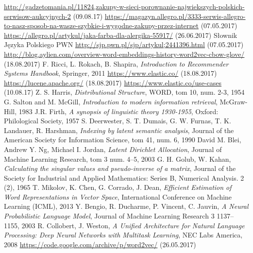\documentclass[pl]{minipw} %
\begin{document}
\begin{thebibliography}{30}
	\url{http://gadzetomania.pl/11824,zakupy-w-sieci-porownanie-najwiekszych-polskich-serwisow-aukcyjnych-2}
	(09.08.17)
	\url{https://magazyn.allegro.pl/3333-serwis-allegro-to-nasz-sposob-na-wasze-szybkie-i-wygodne-zakupy-przez-internet}
	(07.05.2017)
	\url{https://allegro.pl/artykul/jaka-farba-dla-alergika-55917/}
	(26.06.2017)
	Słownik Języka Polskiego PWN
	\url{http://sjp.pwn.pl/sjp/artykul;2441396.html}
	(07.05.2017)
	\url{http://blog.aylien.com/overview-word-embeddings-history-word2vec-cbow-glove/}
	(18.08.2017)
	F. Ricci, L. Rokach, B. Shapira,
	\emph{Introduction to Recommender Systems Handbook},
	Springer,
	2011
	\url{https://www.elastic.co/}
	(18.08.2017)	
	\url{https://lucene.apache.org/}
	(18.08.2017)
	\url{https://www.elastic.co/use-cases}
	(10.08.17)
	Z. S. Harris,
	\emph{Distributional Structure},
	WORD, tom 10, num. 2-3,
	1954
	G. Salton and M. McGill,
	\emph{Introduction to modern information retrieval},
	McGraw-Hill,
	1983
	J.R. Firth,
	\emph{A synopsis of linguistic theory 1930-1955},
	Oxford: Philological Society,
	1957
	S. Deerwester, S. T. Dumais, G. W. Furnas, T. K. Landauer, R. Harshman,
	\emph{Indexing by latent semantic analysis},
	Journal of the American Society for Information Science, tom 41, num. 6,
	1990
	David M. Blei, Andrew Y. Ng, Michael I. Jordan,
	\emph{Latent Dirichlet Allocation},
	Journal of Machine Learning Research, tom 3 num. 4–5,
	2003
	G. H. Golub, W. Kahan,
	\emph{Calculating the singular values and pseudo-inverse of a matrix},
	Journal of the Society for Industrial and Applied Mathematics: Series B, Numerical Analysis. 2 (2),
	1965
	T. Mikolov, K. Chen, G. Corrado, J. Dean,
	\emph{Efficient Estimation of Word Representations in Vector Space},
	International Conference on Machine Learning (ICML),
	2013
	Y. Bengio, R. Ducharme, P. Vincent, C. Jauvin,
	\emph{A Neural Probabilistic Language Model},
	Journal of Machine Learning Research 3 1137–1155,
	2003
	R. Collobert, J. Weston,
	\emph{A Unified Architecture for Natural Language Processing: Deep Neural Networks with Multitask Learning},
	NEC Labs America,
	2008
	\url{https://code.google.com/archive/p/word2vec/}
	(26.05.2017)

\end{thebibliography}
\end{document}
